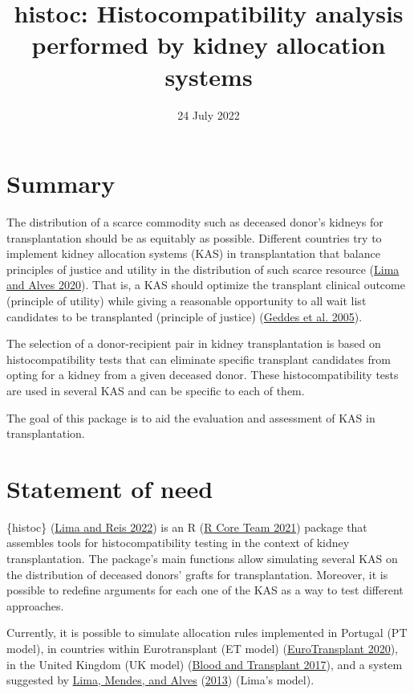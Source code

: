 \documentclass[
]{article}
\title{histoc: Histocompatibility analysis performed by kidney
allocation systems}
\author{}
\date{\vspace{-2.5em}24 July 2022}
\begin{document}
\maketitle

\hypertarget{summary}{%
\section{Summary}\label{summary}}

The distribution of a scarce commodity such as deceased donor's kidneys
for transplantation should be as equitably as possible. Different
countries try to implement kidney allocation systems (KAS) in
transplantation that balance principles of justice and utility in the
distribution of such scarce resource
(\protect\hyperlink{ref-Lima:2020}{Lima and Alves 2020}). That is, a KAS
should optimize the transplant clinical outcome (principle of utility)
while giving a reasonable opportunity to all wait list candidates to be
transplanted (principle of justice)
(\protect\hyperlink{ref-Geddes:2005}{Geddes et al. 2005}).

The selection of a donor-recipient pair in kidney transplantation is
based on histocompatibility tests that can eliminate specific transplant
candidates from opting for a kidney from a given deceased donor. These
histocompatibility tests are used in several KAS and can be specific to
each of them.

The goal of this package is to aid the evaluation and assessment of KAS
in transplantation.

\hypertarget{statement-of-need}{%
\section{Statement of need}\label{statement-of-need}}

\{histoc\} (\protect\hyperlink{ref-histoc}{Lima and Reis 2022}) is an R
(\protect\hyperlink{ref-R}{R Core Team 2021}) package that assembles
tools for histocompatibility testing in the context of kidney
transplantation. The package's main functions allow simulating several
KAS on the distribution of deceased donors' grafts for transplantation.
Moreover, it is possible to redefine arguments for each one of the KAS
as a way to test different approaches.

Currently, it is possible to simulate allocation rules implemented in
Portugal (PT model), in countries within Eurotransplant (ET model)
(\protect\hyperlink{ref-ET}{EuroTransplant 2020}), in the United Kingdom
(UK model) (\protect\hyperlink{ref-UK}{Blood and Transplant 2017}), and
a system suggested by \protect\hyperlink{ref-Lima:2013}{Lima, Mendes,
and Alves} (\protect\hyperlink{ref-Lima:2013}{2013}) (Lima's model).
\end{document}
